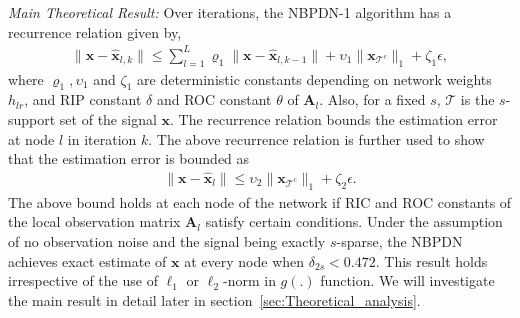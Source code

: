 \documentclass[journal]{IEEEtran}
\newcommand{\mbx}{\mathbf{x}}
\newcommand{\mbA}{\mathbf{A}}
\newcommand{\mbH}{\mathbf{H}}
\newcommand{\T}{\mathcal{T}}
\begin{document}
\emph{Main Theoretical Result:} Over iterations, the NBPDN-1 algorithm has a recurrence relation given by,
\begin{eqnarray*}
\|\mbx - \hat{\mbx}_{l,k}\| \leq \sum\limits_{l=1}^{L} \varrho_1 \|\mbx-\hat{\mbx}_{l,k-1}\| + \upsilon_1 \|\mbx_{\T^c}\|_1 + \zeta_1 \epsilon,
\end{eqnarray*}
where $\varrho_1, \upsilon_1$ and $\zeta_1$ are deterministic constants depending on network weights $h_{lr}$, and RIP constant $\delta$ and ROC constant $\theta$ of $\mbA_l$. Also, for a fixed $s$, $\T$ is the $s$-support set of the signal $\mbx$. The recurrence relation bounds the estimation error at node $l$ in iteration $k$.  The above recurrence relation is further used to show that the estimation error is bounded as
\begin{eqnarray}
\|\mbx-\hat{\mbx}_l\| \leq \upsilon_2 \|\mbx_{\T^c}\|_1 + \zeta_2 \epsilon.
\end{eqnarray}
The above bound holds at each node of the network if RIC and ROC constants of the local observation matrix $\mbA_l$ satisfy certain conditions. Under the assumption of no observation noise and the signal being exactly $s$-sparse, the NBPDN achieves exact estimate of $\mbx$ at every node when $\delta_{2s} < 0.472$. This result holds irrespective of the use of $\ell_1$ or $\ell_2$-norm  in $g(.)$ function. We will investigate the main result in detail later in section~\ref{sec:Theoretical_analysis}.
\end{document}
